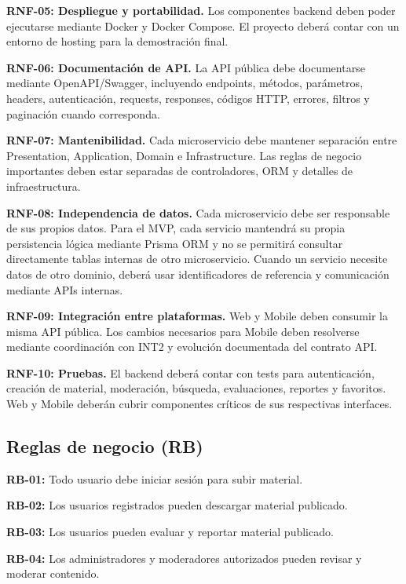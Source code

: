 \documentclass[12pt,a4paper]{article}
\begin{document}
\noindent\textbf{RNF-05: Despliegue y portabilidad.} Los componentes backend deben poder ejecutarse mediante Docker y Docker Compose. El proyecto deberá contar con un entorno de hosting para la demostración final.

\noindent\textbf{RNF-06: Documentación de API.} La API pública debe documentarse mediante OpenAPI/Swagger, incluyendo endpoints, métodos, parámetros, headers, autenticación, requests, responses, códigos HTTP, errores, filtros y paginación cuando corresponda.

\noindent\textbf{RNF-07: Mantenibilidad.} Cada microservicio debe mantener separación entre Presentation, Application, Domain e Infrastructure. Las reglas de negocio importantes deben estar separadas de controladores, ORM y detalles de infraestructura.

\noindent\textbf{RNF-08: Independencia de datos.} Cada microservicio debe ser responsable de sus propios datos. Para el MVP, cada servicio mantendrá su propia persistencia lógica mediante Prisma ORM y no se permitirá consultar directamente tablas internas de otro microservicio. Cuando un servicio necesite datos de otro dominio, deberá usar identificadores de referencia y comunicación mediante APIs internas.

\noindent\textbf{RNF-09: Integración entre plataformas.} Web y Mobile deben consumir la misma API pública. Los cambios necesarios para Mobile deben resolverse mediante coordinación con INT2 y evolución documentada del contrato API.

\noindent\textbf{RNF-10: Pruebas.} El backend deberá contar con tests para autenticación, creación de material, moderación, búsqueda, evaluaciones, reportes y favoritos. Web y Mobile deberán cubrir componentes críticos de sus respectivas interfaces.

\subsection{Reglas de negocio (RB)}

\noindent\textbf{RB-01:} Todo usuario debe iniciar sesión para subir material.

\noindent\textbf{RB-02:} Los usuarios registrados pueden descargar material publicado.

\noindent\textbf{RB-03:} Los usuarios pueden evaluar y reportar material publicado.

\noindent\textbf{RB-04:} Los administradores y moderadores autorizados pueden revisar y moderar contenido.
\end{document}
